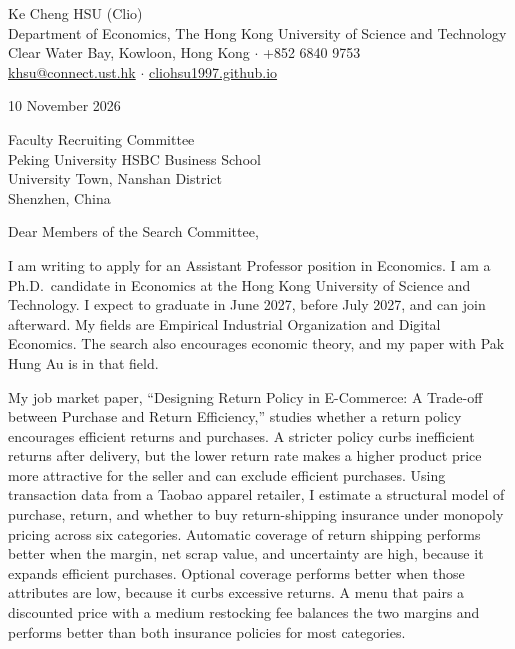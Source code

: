 \documentclass[11pt]{article}
\begin{document}
\begin{flushleft}
Ke Cheng HSU (Clio) \\
Department of Economics, The Hong Kong University of Science and Technology \\
Clear Water Bay, Kowloon, Hong Kong $\cdot$ +852 6840 9753 \\
\href{mailto:khsu@connect.ust.hk}{khsu@connect.ust.hk} $\cdot$ \href{https://cliohsu1997.github.io/}{cliohsu1997.github.io}
\end{flushleft}

10 November 2026

\vspace{0.12em}
Faculty Recruiting Committee \\
Peking University HSBC Business School \\
University Town, Nanshan District \\
Shenzhen, China

\vspace{0.12em}
Dear Members of the Search Committee,

I am writing to apply for an Assistant Professor position in Economics. I am a Ph.D.\ candidate in Economics at the Hong Kong University of Science and Technology. I expect to graduate in June 2027, before July 2027, and can join afterward. My fields are Empirical Industrial Organization and Digital Economics. The search also encourages economic theory, and my paper with Pak Hung Au is in that field.

My job market paper, ``Designing Return Policy in E-Commerce: A Trade-off between Purchase and Return Efficiency,'' studies whether a return policy encourages efficient returns and purchases. A stricter policy curbs inefficient returns after delivery, but the lower return rate makes a higher product price more attractive for the seller and can exclude efficient purchases. Using transaction data from a Taobao apparel retailer, I estimate a structural model of purchase, return, and whether to buy return-shipping insurance under monopoly pricing across six categories. Automatic coverage of return shipping performs better when the margin, net scrap value, and uncertainty are high, because it expands efficient purchases. Optional coverage performs better when those attributes are low, because it curbs excessive returns. A menu that pairs a discounted price with a medium restocking fee balances the two margins and performs better than both insurance policies for most categories.
\end{document}
